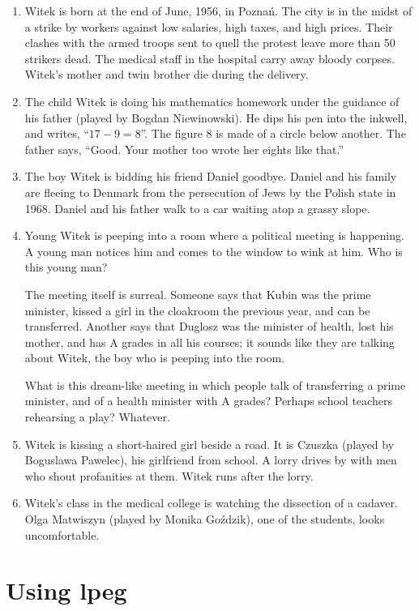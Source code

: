 \documentclass{article}
\begin{document}
\begin{enumerate}
\item Witek is born at the end of June, 1956, in Pozna\'n.  The city
  is in the midst of a strike by workers against low salaries, high
  taxes, and high prices.  Their clashes with the armed troops sent to
  quell the protest leave more than 50 strikers dead.  The medical
  staff in the hospital carry away bloody corpses.  Witek's mother and
  twin brother die during the delivery.
\item The child Witek is doing his mathematics homework under the
  guidance of his father (played by Bogdan Niewinowski).  He dips his
  pen into the inkwell, and writes, ``\(17 - 9 = 8\)''.  The figure
  \(8\) is made of a circle below another.  The father says, ``Good.
  Your mother too wrote her eights like that.''
\item The boy Witek is bidding his friend Daniel goodbye.  Daniel and
  his family are fleeing to Denmark from the persecution of Jews by
  the Polish state in 1968.  Daniel and his father walk to a car
  waiting atop a grassy slope.
\item Young Witek is peeping into a room where a political meeting is
  happening.  A young man notices him and comes to the window to wink
  at him.  Who is this young man?

  The meeting itself is surreal.  Someone says that Kubin was the
  prime minister, kissed a girl in the cloakroom the previous year,
  and can be transferred.  Another says that Duglosz was the minister
  of health, lost his mother, and has A grades in all his courses; it
  sounds like they are talking about Witek, the boy who is peeping
  into the room.

  What is this dream-like meeting in which people talk of transferring
  a prime minister, and of a health minister with A grades?  Perhaps
  school teachers rehearsing a play?  Whatever.
\item Witek is kissing a short-haired girl beside a road.  It is
  Czuszka (played by Boguslawa Pawelec), his girlfriend from school.
  A lorry drives by with men who shout profanities at them.  Witek
  runs after the lorry.
\item Witek's class in the medical college is watching the dissection
  of a cadaver.  Olga Matwiszyn (played by Monika Go\'zdzik), one of
  the students, looks uncomfortable.
\end{enumerate}

\section{Using lpeg}
\label{sec:bdxkrdxt}
\end{document}
